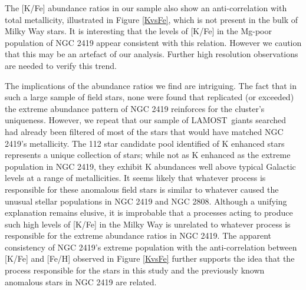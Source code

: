 \documentclass[a4paper,fleqn,usenatbib]{mnras}
\newcommand{\todo}[1]{\textcolor{red}{#1}}
\newcommand{\project}[1]{#1}
\newcommand{\lamost}{\project{LAMOST}}
\begin{document}
The [K/Fe] abundance ratios in our sample also show an anti-correlation with total metallicity, illustrated in Figure \ref{KvsFe}, which is not present in the bulk of Milky Way stars. It is interesting that the levels of [K/Fe] in the Mg-poor population of NGC 2419 appear consistent with this relation. However we caution that this may be an artefact of our analysis. Further high resolution observations are needed to verify this trend.




The implications of the abundance ratios we find are intriguing. The fact that in such a large sample of field stars, none were found that replicated (or exceeded) the extreme abundance pattern of NGC 2419 reinforces for the cluster's uniqueness.
However, we repeat that our sample of \lamost\ giants searched had already been filtered of most of the stars that would have matched NGC 2419's metallicity. The 112 star candidate pool identified of K enhanced stars represents a unique collection of stars; while not as K enhanced as the extreme population in NGC 2419, they exhibit K abundances well above typical Galactic levels at a range of metallicities. It seems likely that whatever process is responsible for these anomalous field stars is similar to whatever caused the unusual stellar populations in NGC 2419 and NGC 2808. Although a unifying explanation remains elusive, it is improbable that a processes acting to produce such high levels of [K/Fe] in the Milky Way is unrelated to whatever process is responsible for the extreme abundance ratios in NGC 2419. The apparent consistency of NGC 2419's extreme population with the anti-correlation between [K/Fe] and [Fe/H] observed in Figure \ref{KvsFe} further supports the idea that the process responsible for the stars in this study and the previously known anomalous stars in NGC 2419 are related.
\end{document}
